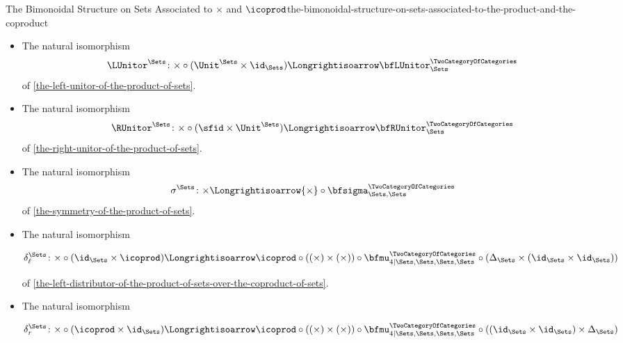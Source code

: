 \begin{proposition}{The Bimonoidal Structure on Sets Associated to $\times$ and $\icoprod$}{the-bimonoidal-structure-on-sets-associated-to-the-product-and-the-coproduct}
\begin{itemize}
\[            \]%
            of \cref{the-associator-of-the-product-of-sets}.
        \item{}The natural isomorphism
            \[
                \LUnitor^{\Sets}%
                \colon%
                {\times}\circ{(\Unit^{\Sets}\times\id_{\Sets})}
                \Longrightisoarrow
                \bfLUnitor^{\TwoCategoryOfCategories}_{\Sets}
            \]%
            of \cref{the-left-unitor-of-the-product-of-sets}.
        \item{}The natural isomorphism
            \[
                \RUnitor^{\Sets}%
                \colon%
                {\times}\circ{({\sfid}\times{\Unit^{\Sets}})}%
                \Longrightisoarrow%
                \bfRUnitor^{\TwoCategoryOfCategories}_{\Sets}%
            \]%
            of \cref{the-right-unitor-of-the-product-of-sets}.
        \item{}The natural isomorphism
            \[
                \sigma^{\Sets}
                \colon
                {\times}
                \Longrightisoarrow
                {\times}\circ{\bfsigma^{\TwoCategoryOfCategories}_{\Sets,\Sets}}
            \]%
            of \cref{the-symmetry-of-the-product-of-sets}.
        \item{}The natural isomorphism
            \begin{envfootnotesize}
                \[
                    \delta^{\Sets}_{\ell}
                    \colon
                    \mathord{\times}\circ(\id_{\Sets}\times\mathord{\icoprod})
                    \Longrightisoarrow
                    \mathord{\icoprod}\circ(\mathord{(\times)}\times\mathord{(\times)})\circ\bfmu^{\TwoCategoryOfCategories}_{4|\Sets,\Sets,\Sets,\Sets}\circ(\Delta_{\Sets}\times(\id_{\Sets}\times\id_{\Sets}))
                \]%
            \end{envfootnotesize}
            of \cref{the-left-distributor-of-the-product-of-sets-over-the-coproduct-of-sets}.
        \item{}The natural isomorphism
            \begin{envfootnotesize}
            \[
                \delta^{\Sets}_{r}
                \colon
                \mathord{\times}\circ(\mathord{\icoprod}\times\id_{\Sets})
                \Longrightisoarrow
                \mathord{\icoprod}\circ(\mathord{(\times)}\times\mathord{(\times)})\circ\bfmu^{\TwoCategoryOfCategories}_{4|\Sets,\Sets,\Sets,\Sets}\circ((\id_{\Sets}\times\id_{\Sets})\times\Delta_{\Sets})
\]
\end{envfootnotesize}
\end{itemize}
\end{proposition}
